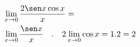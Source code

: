 \begin{ex}
\begin{align}
&\lim_{x\rightarrow 0} \frac{2\sen x\cos x}{x}=\nonumber\\
&\lim_{x\rightarrow 0} \frac{\sen x}{x}\quad.\quad2\lim_{x\rightarrow 0} \cos x = 1.2 = 2\nonumber
\end{align}
\end{ex}
